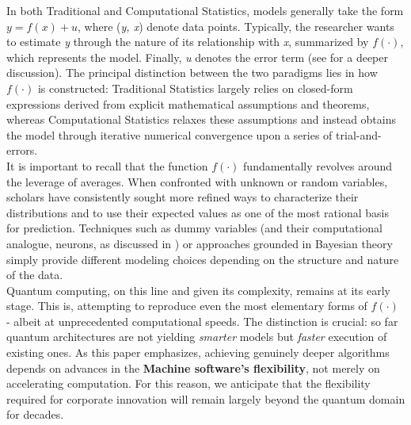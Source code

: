 \documentclass{article}
\begin{document}
In both Traditional and Computational Statistics, models generally take the form \textbf{\begin{math} y = f(x) + u\end{math}}, where (\textit{y, x}) denote data points. Typically, the researcher wants to estimate \textit{y} through the nature of its relationship with \textit{x}, summarized by \begin{math} f(·)\end{math}, which represents the model. Finally, \textit{u} denotes the error term (see \cite{Advances in AI} for a deeper discussion). The principal distinction between the two paradigms lies in how \begin{math} f(·)\end{math} is constructed: Traditional Statistics largely relies on closed-form expressions derived from explicit mathematical assumptions and theorems, whereas Computational Statistics relaxes these assumptions and instead obtains the model through iterative numerical convergence upon a series of trial-and-errors.\\

It is important to recall that the function \begin{math} f(·)\end{math} fundamentally revolves around the leverage of averages. When confronted with unknown or random variables, scholars have consistently sought more refined ways to characterize their distributions and to use their expected values as one of the most rational basis for prediction. Techniques such as dummy variables (and their computational analogue, neurons, as discussed in \cite{Advances in AI}) or approaches grounded in Bayesian theory simply provide different modeling choices depending on the structure and nature of the data.\\

Quantum computing, on this line and given its complexity, remains at its early stage. This is, attempting to reproduce even the most elementary forms of \begin{math} f(·)\end{math} - albeit at unprecedented computational speeds. The distinction is crucial: so far quantum architectures are not yielding \textit{smarter} models but \textit{faster} execution of existing ones. As this paper emphasizes, achieving genuinely deeper algorithms depends on advances in the \textbf{Machine software’s flexibility}, not merely on accelerating computation. For this reason, we anticipate that the flexibility required for corporate innovation will remain largely beyond the quantum domain for decades.\\
\end{document}
